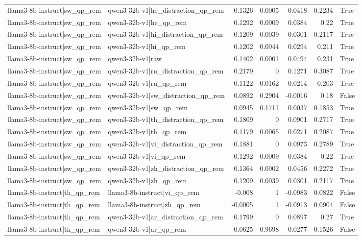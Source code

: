 \begin{table}
\begin{tabular}{l l r r r r l}
llama3-8b-instruct|sw_qp_rem & qwen3-32b-v1|he_distraction_qp_rem & 0.1326 & 0.0005 & 0.0418 & 0.2234 & True \\
llama3-8b-instruct|sw_qp_rem & qwen3-32b-v1|he_qp_rem & 0.1292 & 0.0009 & 0.0384 & 0.22 & True \\
llama3-8b-instruct|sw_qp_rem & qwen3-32b-v1|hi_distraction_qp_rem & 0.1209 & 0.0039 & 0.0301 & 0.2117 & True \\
llama3-8b-instruct|sw_qp_rem & qwen3-32b-v1|hi_qp_rem & 0.1202 & 0.0044 & 0.0294 & 0.211 & True \\
llama3-8b-instruct|sw_qp_rem & qwen3-32b-v1|raw & 0.1402 & 0.0001 & 0.0494 & 0.231 & True \\
llama3-8b-instruct|sw_qp_rem & qwen3-32b-v1|ru_distraction_qp_rem & 0.2179 & 0 & 0.1271 & 0.3087 & True \\
llama3-8b-instruct|sw_qp_rem & qwen3-32b-v1|ru_qp_rem & 0.1122 & 0.0162 & 0.0214 & 0.203 & True \\
llama3-8b-instruct|sw_qp_rem & qwen3-32b-v1|sw_distraction_qp_rem & 0.0892 & 0.2904 & -0.0016 & 0.18 & False \\
llama3-8b-instruct|sw_qp_rem & qwen3-32b-v1|sw_qp_rem & 0.0945 & 0.1711 & 0.0037 & 0.1853 & True \\
llama3-8b-instruct|sw_qp_rem & qwen3-32b-v1|th_distraction_qp_rem & 0.1809 & 0 & 0.0901 & 0.2717 & True \\
llama3-8b-instruct|sw_qp_rem & qwen3-32b-v1|th_qp_rem & 0.1179 & 0.0065 & 0.0271 & 0.2087 & True \\
llama3-8b-instruct|sw_qp_rem & qwen3-32b-v1|vi_distraction_qp_rem & 0.1881 & 0 & 0.0973 & 0.2789 & True \\
llama3-8b-instruct|sw_qp_rem & qwen3-32b-v1|vi_qp_rem & 0.1292 & 0.0009 & 0.0384 & 0.22 & True \\
llama3-8b-instruct|sw_qp_rem & qwen3-32b-v1|zh_distraction_qp_rem & 0.1364 & 0.0002 & 0.0456 & 0.2272 & True \\
llama3-8b-instruct|sw_qp_rem & qwen3-32b-v1|zh_qp_rem & 0.1209 & 0.0039 & 0.0301 & 0.2117 & True \\
llama3-8b-instruct|th_qp_rem & llama3-8b-instruct|vi_qp_rem & -0.008 & 1 & -0.0983 & 0.0822 & False \\
llama3-8b-instruct|th_qp_rem & llama3-8b-instruct|zh_qp_rem & -0.0005 & 1 & -0.0913 & 0.0904 & False \\
llama3-8b-instruct|th_qp_rem & qwen3-32b-v1|ar_distraction_qp_rem & 0.1799 & 0 & 0.0897 & 0.27 & True \\
llama3-8b-instruct|th_qp_rem & qwen3-32b-v1|ar_qp_rem & 0.0625 & 0.9698 & -0.0277 & 0.1526 & False \\

\end{tabular}
\end{table}
